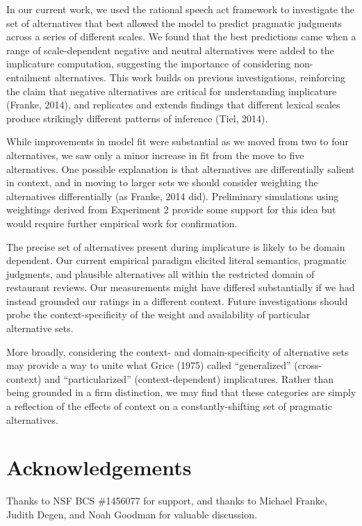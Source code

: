 \documentclass[10pt, letterpaper]{article}
\begin{document}
In our current work, we used the rational speech act framework to
investigate the set of alternatives that best allowed the model to
predict pragmatic judgments across a series of different scales. We
found that the best predictions came when a range of scale-dependent
negative and neutral alternatives were added to the implicature
computation, suggesting the importance of considering non-entailment
alternatives. This work builds on previous investigations, reinforcing
the claim that negative alternatives are critical for understanding
implicature (Franke, 2014), and replicates and extends findings that
different lexical scales produce strikingly different patterns of
inference (Tiel, 2014).

While improvements in model fit were substantial as we moved from two to
four alternatives, we saw only a minor increase in fit from the move to
five alternatives. One possible explanation is that alternatives are
differentially salient in context, and in moving to larger sets we
should consider weighting the alternatives differentially (as Franke,
2014 did). Preliminary simulations using weightings derived from
Experiment 2 provide some support for this idea but would require
further empirical work for confirmation.

The precise set of alternatives present during implicature is likely to
be domain dependent. Our current empirical paradigm elicited literal
semantics, pragmatic judgments, and plausible alternatives all within
the restricted domain of restaurant reviews. Our measurements might have
differed substantially if we had instead grounded our ratings in a
different context. Future investigations should probe the
context-specificity of the weight and availability of particular
alternative sets.

More broadly, considering the context- and domain-specificity of
alternative sets may provide a way to unite what Grice (1975) called
``generalized'' (cross-context) and ``particularized''
(context-dependent) implicatures. Rather than being grounded in a firm
distinction, we may find that these categories are simply a reflection
of the effects of context on a constantly-shifting set of pragmatic
alternatives.

\section{Acknowledgements}\label{acknowledgements}

Thanks to NSF BCS \#1456077 for support, and thanks to Michael Franke,
Judith Degen, and Noah Goodman for valuable discussion.
\end{document}
